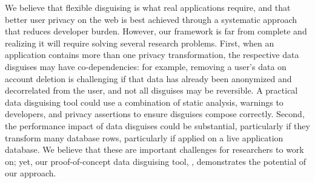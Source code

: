 %
We believe that flexible disguising is what real applications require, and that better user
privacy on the web is best achieved through a systematic approach that reduces developer
burden.
%
However, our framework is far from complete and realizing it will require solving several
research problems.
%
First, when an application contains more than one privacy transformation, the respective
data disguises may have co-dependencies: for example, removing a user's data on account
deletion is challenging if that data has already been anonymized and decorrelated from the
user, and not all disguises may be reversible.
%
A practical data disguising tool could use a combination of static analysis, warnings to
developers, and privacy assertions to ensure disguises compose correctly.
%
Second, the performance impact of data disguises could be substantial, particularly if they
transform many database rows, particularly if applied on a live application database.
%
We believe that these are important challenges for researchers to work on; yet,
%
%
%
%
our proof-of-concept data disguising tool, \sys, demonstrates the potential of our approach.
%
%
